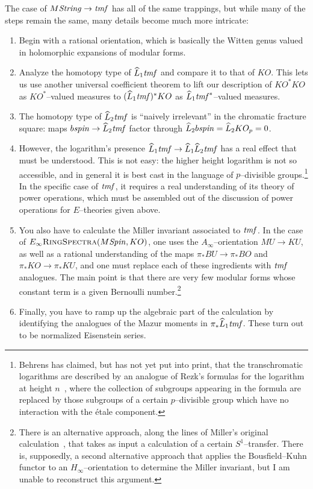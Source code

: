 The case of \(M\mathit{String} \to \mathit{tmf}\) has all of the same trappings, but while many of the steps remain the same, many details become much more intricate:
\begin{enumerate}
    \item Begin with a rational orientation, which is basically the Witten genus valued in holomorphic expansions of modular forms.
    \item Analyze the homotopy type of \(\widehat L_1 \mathit{tmf}\) and compare it to that of \(KO\).  This lets us use another universal coefficient theorem to lift our description of \(KO^* KO\) as \(KO^*\)--valued measures to \((\widehat L_1 \mathit{tmf})^* KO\) as \(\widehat L_1 \mathit{tmf}^*\)--valued measures.
    \item The homotopy type of \(\widehat L_2 \mathit{tmf}\) is ``naively irrelevant'' in the chromatic fracture square: maps \(b\mathit{spin} \to \widehat L_2 \mathit{tmf}\) factor through \(\widehat L_2 b\mathit{spin} = \widehat L_2 KO_p = 0\).
    \item However, the logarithm's presence \(\widehat L_1 \mathit{tmf} \to \widehat L_1 \widehat L_2 \mathit{tmf}\) has a real effect that must be understood.  This is not easy: the higher height logarithm is not so accessible, and in general it is best cast in the language of \(p\)--divisible groups.\footnote{Behrens has claimed, but has not yet put into print, that the transchromatic logarithms are described by an analogue of Rezk's formulas for the logarithm at height \(n\)~\cite[Subsections 1.10 and 1.12]{RezkLogarithm}, where the collection of subgroups appearing in the formula are replaced by those subgroups of a certain \(p\)--divisible group which have no interaction with the \'etale component.}  In the specific case of \(\mathit{tmf}\), it requires a real understanding of its theory of power operations, which must be assembled out of the discussion of power operations for \(E\)--theories given above.
    \item You also have to calculate the Miller invariant associated to \(\mathit{tmf}\).  In the case of \(E_\infty\normalfont\textsc{RingSpectra}(M\mathit{Spin}, KO)\), one uses the \(A_\infty\)--orientation \(MU \to KU\), as well as a rational understanding of the maps \(\pi_* BU \to \pi_* BO\) and \(\pi_* KO \to \pi_* KU\), and one must replace each of these ingredients with \(\mathit{tmf}\) analogues.  The main point is that there are very few modular forms whose constant term is a given Bernoulli number.\footnote{There is an alternative approach, along the lines of Miller's original calculation~\cite{MillerBernoulliNos}, that takes as input a calculation of a certain \(S^1\)--transfer.  There is, supposedly, a second alternative approach that applies the Bousfield--Kuhn functor to an \(H_\infty\)--orientation to determine the Miller invariant, but I am unable to reconstruct this argument.}
    \item Finally, you have to ramp up the algebraic part of the calculation by identifying the analogues of the Mazur moments in \(\pi_* \widehat L_1 \mathit{tmf}\).  These turn out to be normalized Eisenstein series.
\end{enumerate}









